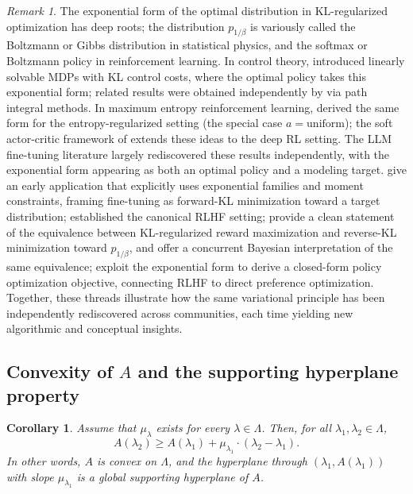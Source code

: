 \documentclass[11pt, a4paper, 
onecolumn, 
showabstract]{naverlabseurope-onecol-flex}
\newtheorem{corollary}[theorem]{Corollary}
\theoremstyle{definition}
\theoremstyle{remark}
\newtheorem{remark}[theorem]{Remark}
\begin{document}
\begin{remark}
The exponential form of the optimal distribution in KL-regularized optimization has deep roots; 
the distribution $p_{1/\beta}$ is variously called the Boltzmann or Gibbs distribution in 
statistical physics, and the softmax or Boltzmann policy in reinforcement learning.
In control theory, \cite{Todorov2007} introduced linearly solvable MDPs with KL control costs, 
where the optimal policy takes this exponential form; related results were obtained independently 
by \cite{Kappen2005} via path integral methods.
In maximum entropy reinforcement learning, \cite{Ziebart2010} derived the same form for the 
entropy-regularized setting (the special case $a = \mathrm{uniform}$); the soft actor-critic 
framework of \cite{Haarnoja2018} extends these ideas to the deep RL setting.
The LLM fine-tuning literature largely rediscovered these results independently, with the 
exponential form appearing as both an optimal policy and a modeling target.
\cite{Khalifa2021} give an early application that explicitly uses exponential families and moment 
constraints, framing fine-tuning as forward-KL minimization toward a target distribution; 
\cite{Ouyang2022} established the canonical RLHF setting; \cite[Theorem~1]{Korbak2022} provide 
a clean statement of the equivalence between KL-regularized reward maximization and reverse-KL 
minimization toward $p_{1/\beta}$, and \cite{korbak_rl_2022} offer a concurrent Bayesian 
interpretation of the same equivalence; \cite{Rafailov2023} exploit the exponential form to 
derive a closed-form policy optimization objective, connecting RLHF to direct preference 
optimization.
Together, these threads illustrate how the same variational principle has been independently 
rediscovered across communities, each time yielding new algorithmic and conceptual insights.
\end{remark}


\subsection{Convexity of $A$ and the supporting hyperplane property}\label{sec:convexity}

\begin{corollary}\label{cor:subgradient}
Assume that $\mu_\lambda$ exists for every $\lambda\in\Lambda$. Then, for all
$\lambda_1,\lambda_2\in\Lambda$,
\begin{equation}\label{eq:subgradient}
    A(\lambda_2) \geq A(\lambda_1) + \mu_{\lambda_1} \cdot (\lambda_2 - \lambda_1).
\end{equation}
In other words, $A$ is convex on $\Lambda$, and the hyperplane through $({\lambda_1}, A(\lambda_1))$ with slope $\mu_{\lambda_1}$ is a global supporting hyperplane of $A$.
\end{corollary}
\end{document}
